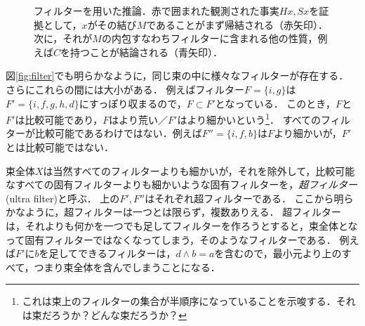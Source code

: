 \documentclass[11pt,a4paper, dvipdfmx]{jsarticle}
\begin{document}
\begin{figure}[h]
    \centering
    \caption{フィルターを用いた推論．赤で囲まれた観測された事実$Hx, Sx$を証拠として，$x$がその結び$M$であることがまず帰結される（赤矢印）．次に，それが$M$の内包すなわちフィルターに含まれる他の性質，例えば$C$を持つことが結論される（青矢印）．}
    \label{fig:inference} 
\end{figure}




図\ref{fig:filter}でも明らかなように，同じ束の中に様々なフィルターが存在する．
さらにこれらの間には大小がある．
例えばフィルター$F = \{i,g\}$は$F' = \{i, f, g, h, d\}$にすっぽり収まるので，$F \subset F'$となっている．
このとき，$F$と$F'$は比較可能であり，$F$はより荒い／$F'$はより細かいという\footnote{これは束上のフィルターの集合が半順序になっていることを示唆する．それは束だろうか？どんな束だろうか？}．
すべてのフィルターが比較可能であるわけではない．例えば$F'' = \{i, f, b\}$は$F$より細かいが，$F'$とは比較可能ではない．

束全体$X$は当然すべてのフィルターよりも細かいが，それを除外して，比較可能なすべての固有フィルターよりも細かいような固有フィルターを，\emph{超フィルター}(ultra filter)と呼ぶ．
上の$F', F''$はそれぞれ超フィルターである．
ここから明らかなように，超フィルターは一つとは限らず，複数ありえる．
超フィルターは，それよりも何かを一つでも足してフィルターを作ろうとすると，束全体となって固有フィルターではなくなってしまう，そのようなフィルターである．
例えば$F'$に$b$を足してできるフィルターは，$d \wedge b = a$を含むので，最小元より上のすべて，つまり束全体を含んでしまうことになる．

\end{document}
